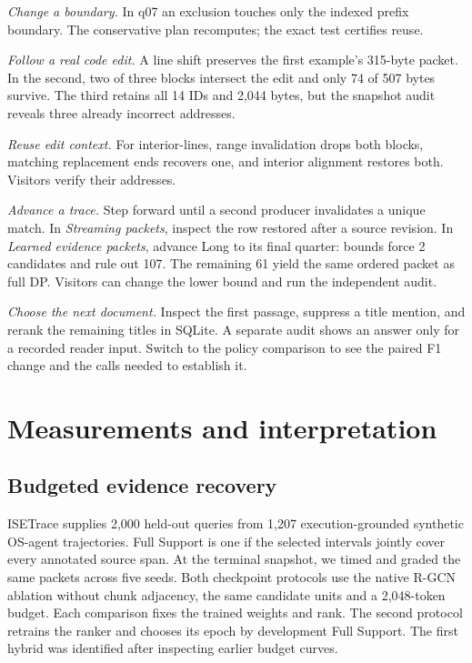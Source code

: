\documentclass[conference]{IEEEtran}
\begin{document}
\textit{Change a boundary.} In q07 an exclusion touches only the indexed prefix boundary. The conservative plan recomputes; the exact test certifies reuse.

\textit{Follow a real code edit.} A line shift preserves the first example's 315-byte packet. In the second, two of three blocks intersect the edit and only 74 of 507 bytes survive. The third retains all 14 IDs and 2,044 bytes, but the snapshot audit reveals three already incorrect addresses. 

\textit{Reuse edit context.} For interior-lines, range invalidation drops both blocks, matching replacement ends recovers one, and interior alignment restores both. Visitors verify their addresses.

\textit{Advance a trace.} Step forward until a second producer invalidates a unique match. In \emph{Streaming packets}, inspect the row restored after a source revision. In \emph{Learned evidence packets}, advance Long to its final quarter: bounds force 2 candidates and rule out 107. The remaining 61 yield the same ordered packet as full DP. Visitors can change the lower bound and run the independent audit.

\textit{Choose the next document.} Inspect the first passage, suppress a title mention, and rerank the remaining titles in SQLite. A separate audit shows an answer only for a recorded reader input. Switch to the policy comparison to see the paired F1 change and the calls needed to establish it.

\section{Measurements and interpretation}
\subsection{Budgeted evidence recovery}
ISETrace supplies 2,000 held-out queries from 1,207 execution-grounded synthetic OS-agent trajectories. Full Support is one if the selected intervals jointly cover every annotated source span. At the terminal snapshot, we timed and graded the same packets across five seeds. Both checkpoint protocols use the native R-GCN ablation without chunk adjacency, the same candidate units and a 2,048-token budget. Each comparison fixes the trained weights and rank. The second protocol retrains the ranker and chooses its epoch by development Full Support. The first hybrid was identified after inspecting earlier budget curves.
\end{document}
